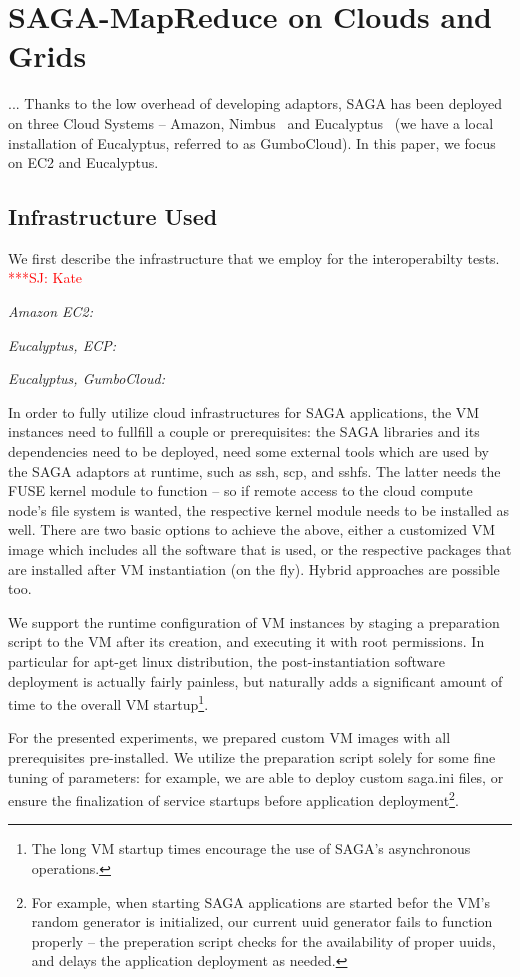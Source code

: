 \documentclass[conference,final]{IEEEtran}
\newcommand{\jhanote}[1]{ {\textcolor{red} { ***SJ: #1 }}}
\newcommand{\jhanote}[1]{}
\begin{document}
\section{SAGA-MapReduce on Clouds and Grids}

... Thanks to the low overhead of developing adaptors, SAGA has been
deployed on three Cloud Systems -- Amazon, Nimbus~\cite{nimbus} and
Eucalyptus~\cite{eucalyptus} (we have a local installation of
Eucalyptus, referred to as GumboCloud).  In this paper, we focus on
EC2 and Eucalyptus.


\subsection*{Infrastructure Used} We first describe the infrastructure
that we employ for the interoperabilty tests.  \jhanote{Kate}

{\it Amazon EC2:}

{\it Eucalyptus, ECP:}

{\it Eucalyptus, GumboCloud:}


In order to fully utilize cloud infrastructures for SAGA applications,
the VM instances need to fullfill a couple or prerequisites: the SAGA
libraries and its dependencies need to be deployed, need some external
tools which are used by the SAGA adaptors at runtime, such as ssh,
scp, and sshfs.  The latter needs the FUSE kernel module to function
-- so if remote access to the cloud compute node's file system is
wanted, the respective kernel module needs to be installed as well.
There are two basic options to achieve the above, either a customized
VM image which includes all the software that is used, or the
respective packages that are installed after VM instantiation (on the
fly).  Hybrid approaches are possible too.

We support the runtime configuration of VM instances by staging a
preparation script to the VM after its creation, and executing it with
root permissions.  In particular for apt-get linux distribution, the
post-instantiation software deployment is actually fairly painless,
but naturally adds a significant amount of time to the overall VM
startup\footnote{The long VM startup times encourage the use of SAGA's
  asynchronous operations.}.

For the presented experiments, we prepared custom VM images with all
prerequisites pre-installed.  We utilize the preparation script solely
for some fine tuning of parameters: for example, we are able to deploy
custom saga.ini files, or ensure the finalization of service startups
before application deployment\footnote{For example, when starting SAGA
  applications are started befor the VM's random generator is
  initialized, our current uuid generator fails to function properly
  -- the preperation script checks for the availability of proper
  uuids, and delays the application deployment as needed.}.
\end{document}
